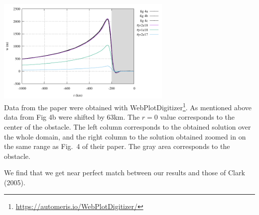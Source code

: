 \begin{center}
\includegraphics[width=8.4cm]{python_codes/fieldstone_108/results/w_eta_zoom.pdf}\\
{\captionfont Data from the paper were obtained with WebPlotDigitizer\footnote{\url{https://automeris.io/WebPlotDigitizer/}}. 
As mentioned above data from Fig 4b were shifted by 63km. The $r=0$ value corresponds to the center of the obstacle. The left 
column corresponds to the obtained solution over the whole domain, and the right column to the solution obtained zoomed in 
on the same range as Fig.~4 of their paper. The gray area corresponds to the obstacle.}
\end{center}

We find that we get near perfect match between our results and those of Clark \etal (2005). 



